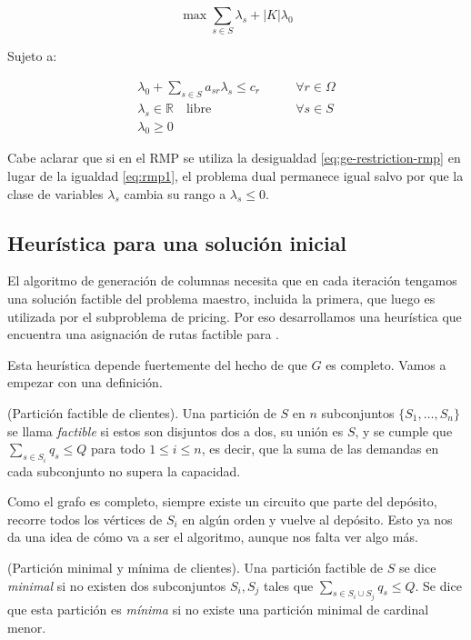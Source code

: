 \begin{equation}
    \max \sum_{s \in S} \lambda_s + |K| \lambda_0 
\end{equation}

Sujeto a:

\begin{align}
    \lambda_0 + \sum_{s \in S} {a_{sr} \lambda_s} \leq c_r \qquad & \forall {r \in \Omega} \\
\lambda_s \in \mathbb{R} \quad \text{libre}
\qquad &\forall {s \in S} \\
\lambda_0 \geq 0 &
\end{align}

Cabe aclarar que si en el RMP se utiliza la desigualdad \ref{eq:ge-restriction-rmp} en lugar de la igualdad \ref{eq:rmp1}, el problema dual permanece igual salvo por que la clase de variables $\lambda_s$ cambia su rango a $\lambda_s \leq 0$. 


\subsection{Heurística para una solución inicial}
\label{section:initial-solution-heuristic}

El algoritmo de generación de columnas necesita que en cada iteración tengamos una solución factible del problema maestro, incluida la primera, que luego es utilizada por el subproblema de pricing. Por eso desarrollamos una heurística que encuentra una asignación de rutas factible para .

Esta heurística depende fuertemente del hecho de que $G$ es completo. Vamos a empezar con una definición.

\begin{definition}
    (Partición factible de clientes).
    Una partición de $S$ en $n$ subconjuntos $\{S_1, \dots, S_n\}$ se llama \emph{factible} si estos son disjuntos dos a dos, su unión es $S$, y se cumple que $\sum_{s \in S_i} q_s \leq Q$ para todo $1 \leq i \leq n$, es decir, que la suma de las demandas en cada subconjunto no supera la capacidad.
\end{definition}

Como el grafo es completo, siempre existe un circuito que parte del depósito, recorre todos los vértices de $S_i$ en algún orden y vuelve al depósito. Esto ya nos da una idea de cómo va a ser el algoritmo, aunque nos falta ver algo más. 

\begin{definition}
    (Partición minimal y mínima de clientes).
    Una partición factible de $S$ se dice \emph{minimal} si no existen dos subconjuntos $S_i, S_j$ tales que $\sum_{s \in S_i \cup S_j} q_s \leq Q$. Se dice que esta partición es \emph{mínima} si no existe una partición minimal de cardinal menor.
\end{definition}

